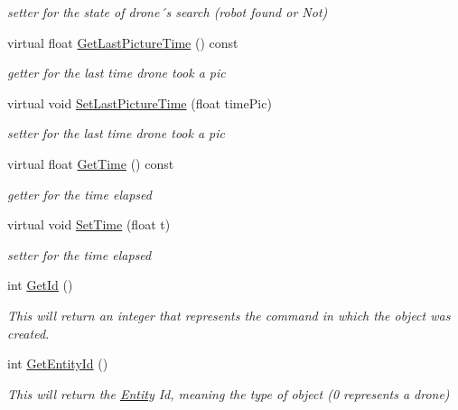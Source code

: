 \begin{DoxyCompactItemize}
\begin{DoxyCompactList}\small\item\em setter for the state of drone´s search (robot found or Not) \end{DoxyCompactList}\item 
virtual float \hyperlink{classBatteryDecorator_a661b3722c37ce7d9690e50724eac863e}{Get\+Last\+Picture\+Time} () const
\begin{DoxyCompactList}\small\item\em getter for the last time drone took a pic \end{DoxyCompactList}\item 
virtual void \hyperlink{classBatteryDecorator_abcaad479f82c6b8fcef4b511fb702d61}{Set\+Last\+Picture\+Time} (float time\+Pic)
\begin{DoxyCompactList}\small\item\em setter for the last time drone took a pic \end{DoxyCompactList}\item 
virtual float \hyperlink{classBatteryDecorator_a87cb6d468b6cd418775b4e01308fc0bf}{Get\+Time} () const
\begin{DoxyCompactList}\small\item\em getter for the time elapsed \end{DoxyCompactList}\item 
virtual void \hyperlink{classBatteryDecorator_abf7e2a2b4634330de27e7072236ffc5f}{Set\+Time} (float t)
\begin{DoxyCompactList}\small\item\em setter for the time elapsed \end{DoxyCompactList}\item 
int \hyperlink{classBatteryDecorator_a0a9d1aedcbbff75c0a88612cb4604fb3}{Get\+Id} ()
\begin{DoxyCompactList}\small\item\em This will return an integer that represents the command in which the object was created. \end{DoxyCompactList}\item 
int \hyperlink{classBatteryDecorator_a38fb935ea609ef4e38ebb50e70200a43}{Get\+Entity\+Id} ()
\begin{DoxyCompactList}\small\item\em This will return the \hyperlink{classEntity}{Entity} Id, meaning the type of object (0 represents a drone) \end{DoxyCompactList}\item 

\end{DoxyCompactItemize}
